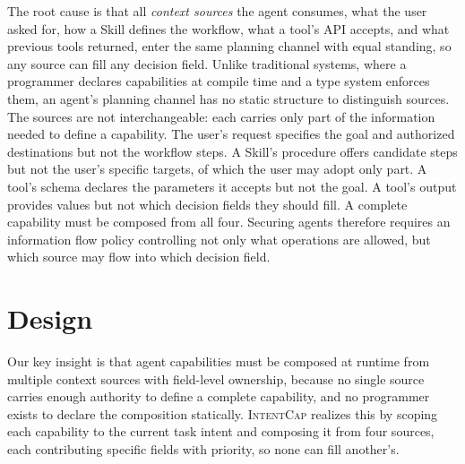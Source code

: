 \documentclass[sigconf,nonacm]{acmart}
\newcommand{\sys}{\textsc{IntentCap}\xspace}
\begin{document}
The root cause is that all \emph{context sources} the agent consumes, what the user asked for, how a Skill defines the workflow, what a tool's API accepts, and what previous tools returned, enter the same planning channel with equal standing, so any source can fill any decision field.
Unlike traditional systems, where a programmer declares capabilities at compile time and a type system enforces them, an agent's planning channel has no static structure to distinguish sources.
The sources are not interchangeable: each carries only part of the information needed to define a capability. The user's request specifies the goal and authorized destinations but not the workflow steps. A Skill's procedure offers candidate steps but not the user's specific targets, of which the user may adopt only part. A tool's schema declares the parameters it accepts but not the goal. A tool's output provides values but not which decision fields they should fill. A complete capability must be composed from all four.
Securing agents therefore requires an information flow policy controlling not only what operations are allowed, but which source may flow into which decision field.

\section{Design}
\label{sec:design}

Our key insight is that agent capabilities must be composed at runtime from multiple context sources with field-level ownership, because no single source carries enough authority to define a complete capability, and no programmer exists to declare the composition statically.
\sys realizes this by scoping each capability to the current task intent and composing it from four sources, each contributing specific fields with priority, so none can fill another's.
\end{document}
